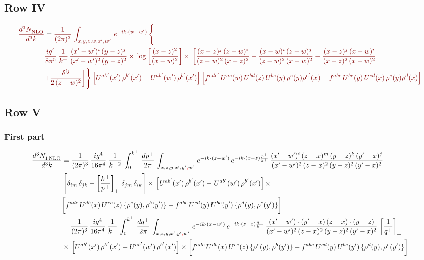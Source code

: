 \documentclass[9pt]{article}
\numberwithin{equation}{section}
\begin{document}
\subsection{Row IV}
\begin{align}
    {\color{red!50!black}\frac{d^{3}N_{\rm NLO}^{\rm}}{d^{3}k}}  & = {\color{red!50!black}\frac{1}{(2\pi)^{3}}\,
    \int_{x,y,z,w,x',w'}\,e^{-ik\cdot (w-w^\prime)}\,\Bigg\{}\notag \\
& {\color{red!50!black}\frac{ig^{4}}{8\pi^{5}}\,\frac{1}{k^{+}}\,\frac{(x'-w')^{i}\,(y-z)^{j}}{(x'-w')^{2}\,(y-z)^{2}}\times\,\log{\left[\frac{(x-z)^{2}}{(x-w)^{2}}\right]}\times\, \bigg[\frac{(x-z)^{j}\,(z-w)^{i}}{(z-w)^{2}\,(x-z)^{2}} -\frac{(x-w)^{i}\,(z-w)^{j}}{(z-w)^{2}\,(x-w)^{2}}-\frac{(x-z)^{j}\,(x-w)^{i}}{(x-z)^{2}\,(x-w)^{2}}}\notag \\ & {\color{red!50!black}+\frac{\delta^{ij}}{2\,(z-w)^{2}}\bigg]\Bigg\} \left[U^{ab'}(x')\,\rho^{b'}(x')-U^{ab'}(w')\,\rho^{b'}(x')\right] \left[f^{cdc'}\,U^{ac}(w)\,U^{bd}(z)\,U^{be}(y)\,\rho^{e}(y)\rho^{c'}(x)-f^{abc}\,U^{be}(y)\,U^{cd}(x)\,\rho^{e}(y)\rho^{d}(x)\right]}
\end{align}
\par\noindent
\subsection{Row V}
\subsubsection*{First part}
\begin{align}
     \frac{d^{3}N_{1\,\rm NLO}^{\rm}}{d^{3}k}  & =  \frac{1}{(2\pi)^{3}}\, \frac{ig^{4}}{16\pi^{4}}\, \frac{1}{k^{+\,2}}\,\int_{0}^{k^{+}}\, \frac{dp^{+}}{2\pi}\,\int_{x,z,y,x',y'{\color{red},}w'}\,e^{-ik\cdot (z-w^\prime)}\,e^{-ik\cdot (x-z)\frac{p^{+}}{k^{+}}}\,\frac{(x'-w')^{i}\,(z-x)^{m}\,(y-z)^{k}\,(y'-x)^{j}}{(x'-w')^{2}\,(z-x)^{2}\,(y-z)^{2}\,(y'-x)^{2}}\,\notag \\ & \left[\delta_{im}\,\delta_{jk}-\left[\frac{k^{+}}{p^{+}}\right]_{+}\, \delta_{jm}\,\delta_{ik}\right]\times\, \left[U^{ab'}(x')\,\rho^{b'}(x')-U^{ab'}(w')\,\rho^{b'}(x')\right]\times\notag \\ & \bigg[f^{adc}\,U^{db}(x)\,U^{ce}(z)\, \{\rho^{e}(y),\rho^{b}(y')\}-f^{abc}\,U^{cd}(y)\,U^{be}(y')\, \{\rho^{d}(y),\rho^{e}(y')\}\bigg] \notag \\ & -\frac{1}{(2\pi)^{3}}\, \frac{ig^{4}}{16\pi^{4}}\, \frac{1}{k^{+}}\,\int_{0}^{k^{+}}\, \frac{dq^{+}}{2\pi}\,\int_{x,z,y,x',y'{\color{red},}w'}\,e^{-ik\cdot (x-w^\prime)}\,e^{-ik\cdot (z-x)\frac{q^{+}}{k^{+}}}\,\frac{(x'-w')\cdot (y'-x)\,(z-x)\cdot (y-z)}{(x'-w')^{2}\,(z-x)^{2}\,(y-z)^{2}\,(y'-x)^{2}}\,\left[\frac{1}{q^{+}}\right]_{+}\notag \\ & \times\, \left[U^{ab'}(x')\,\rho^{b'}(x')-U^{ab'}(w')\,\rho^{b'}(x')\right]\times \bigg[f^{adc}\,U^{db}(x)\,U^{ce}(z)\, \{\rho^{e}(y),\rho^{b}(y')\}-f^{abc}\,U^{cd}(y)\,U^{be}(y')\, \{\rho^{d}(y),\rho^{e}(y')\}\bigg]
\end{align}
\end{document}
